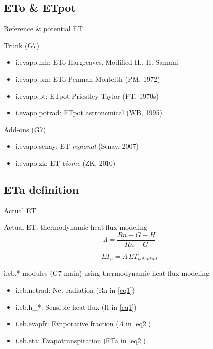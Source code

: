 \documentclass[xcolor=dvipsnames,beamer]{beamer} %
\begin{document}
\subsection{ETo \& ETpot}
\begin{frame}[fragile]{Reference \& potential ET}

\begin{block}{Trunk (G7)}
\begin{itemize}
 \item i.evapo.mh: ETo Hargreaves, Modified H., H.-Samani 
 \item i.evapo.pm: ETo Penman-Monteith (PM, 1972)
 \item i.evapo.pt: ETpot Priestley-Taylor (PT, 1970s)
 \item i.evapo.potrad: ETpot astronomical (WB, 1995)
\end{itemize}
\end{block}

\begin{block}{Add-ons (G7)}
\begin{itemize}
 \item i.evapo.senay: ET \textit{regional} (Senay, 2007)
 \item i.evapo.zk: ET \textit{biome} (ZK, 2010)
\end{itemize}
\end{block}
\end{frame}

\subsection{ETa definition}
\begin{frame}[fragile]{Actual ET}

Actual ET: thermodynamic heat flux modeling\\

\begin{equation}\label{eq1}
\Lambda = \frac {Rn - G - H} {Rn - G}
\end{equation}

\begin{equation}\label{eq2}
ET_a = \Lambda \, ET_{potential}
\end{equation}

\begin{block}{i.eb.* modules (G7 main) using thermodynamic heat flux modeling}
\begin{itemize}
 \item i.eb.netrad: Net radiation (Rn in \ref{eq1}) 
 \item i.eb.h\_*: Sensible heat flux (H in \ref{eq1})
 \item i.eb.evapfr: Evaporative fraction ($\Lambda$ in \ref{eq2})
 \item i.eb.eta: Evapotranspiration (ETa in \ref{eq2})
\end{itemize}
\end{block}
\end{frame}
\end{document}
